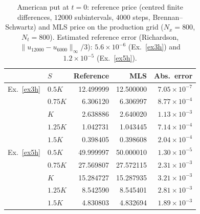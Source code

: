 \begin{table}[htbp]
\centering
\small
\caption{American put at $t=0$: reference price (centred finite differences, $12000$ subintervals, $4000$ steps, Brennan--Schwartz) and MLS price on the production grid ($N_x=800$, $N_t=800$). Estimated reference error (Richardson, $\|u_{12000}-u_{6000}\|_\infty/3$): $5.6\times10^{-6}$ (Ex.~\ref{ex3h}) and $1.2\times10^{-5}$ (Ex.~\ref{ex5h}).}
\label{tab:american_pointwise}
\begin{tabular}{llrrr}
\toprule
 & $S$ & Reference & MLS & Abs.\ error \\
\midrule
Ex.~\ref{ex3h} & $0.5K$ & 12.499999 & 12.500000 & $7.05\times10^{-7}$ \\
 & $0.75K$ & 6.306120 & 6.306997 & $8.77\times10^{-4}$ \\
 & $K$ & 2.638886 & 2.640020 & $1.13\times10^{-3}$ \\
 & $1.25K$ & 1.042731 & 1.043445 & $7.14\times10^{-4}$ \\
 & $1.5K$ & 0.398405 & 0.398608 & $2.04\times10^{-4}$ \\
\midrule
Ex.~\ref{ex5h} & $0.5K$ & 49.999997 & 50.000010 & $1.30\times10^{-5}$ \\
 & $0.75K$ & 27.569807 & 27.572115 & $2.31\times10^{-3}$ \\
 & $K$ & 15.284727 & 15.287935 & $3.21\times10^{-3}$ \\
 & $1.25K$ & 8.542590 & 8.545401 & $2.81\times10^{-3}$ \\
 & $1.5K$ & 4.830803 & 4.832694 & $1.89\times10^{-3}$ \\
\bottomrule
\end{tabular}
\end{table}
